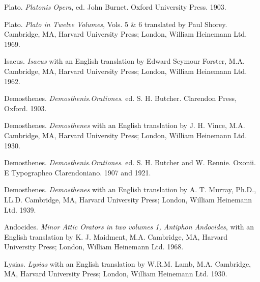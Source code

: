 \documentclass[a4paper,twocolumn,twoside,notitlepage,10pt]{article}
\begin{document}
\begin{description} %
    \item Plato. \emph{Platonis Opera}, ed. John Burnet. Oxford University Press. 1903.
    \item Plato. \emph{Plato in Twelve Volumes}, Vols. 5 \& 6 translated by Paul Shorey. Cambridge, MA, Harvard University Press; London, William Heinemann Ltd. 1969.

    \item Isaeus. \emph{Isaeus} with an English translation by Edward Seymour Forster, M.A. Cambridge, MA, Harvard University Press; London, William Heinemann Ltd. 1962.

    \item Demosthenes. \emph{Demosthenis.Orationes}. ed. S. H. Butcher. Clarendon Press, Oxford. 1903.
    \item Demosthenes. \emph{Demosthenes} with an English translation by J. H. Vince, M.A. Cambridge, MA, Harvard University Press; London, William Heinemann Ltd. 1930.

    \item Demosthenes. \emph{Demosthenis.Orationes}. ed. S. H. Butcher and W. Rennie. Oxonii. E Typographeo Clarendoniano. 1907 and 1921.
    \item Demosthenes. \emph{Demosthenes} with an English translation by A. T. Murray, Ph.D., LL.D. Cambridge, MA, Harvard University Press; London, William Heinemann Ltd. 1939.

    \item Andocides. \emph{Minor Attic Orators in two volumes 1, Antiphon Andocides}, with an English translation by K. J. Maidment, M.A. Cambridge, MA, Harvard University Press; London, William Heinemann Ltd. 1968.
    \item Lysias. \emph{Lysias} with an English translation by W.R.M. Lamb, M.A. Cambridge, MA, Harvard University Press; London, William Heinemann Ltd. 1930.
\end{description}

\onecolumn
\printindex[eng]
\printindex[grc]
\end{document}
